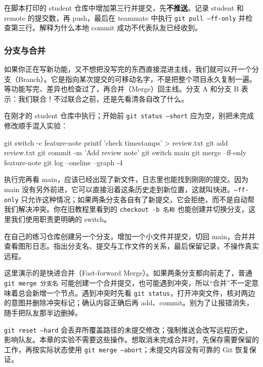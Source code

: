 \begin{exercise}\label{ex:v1-git-commits}
在脚本打印的 student 仓库中增加第三行并提交，先\textbf{不推送}。记录 student 和 remote 的提交数，再 push，最后在 teammate 中执行 \texttt{git pull --ff-only} 并检查第三行。解释为什么本地 commit 成功不代表队友已经收到。
\end{exercise}

\subsubsection{分支与合并}
如果你正在写新功能，又不想把没写完的东西直接混进主线，我们就可以开一个分支（Branch）。它是指向某次提交的可移动名字，不是把整个项目永久复制一遍。等功能写完、差异也检查过了，再合并（Merge）回主线。分支 A 和分支 B 表示：我们联合！不过联合之前，还是先看清各自改了什么。
\begin{example}[没有冲突的最小分支实验]
在刚才的 student 仓库中执行；开始前 \texttt{git status --short} 应为空，别把未完成修改顺手混入实验：

\begin{tbash}
git switch -c feature-note
printf 'check timestamps\n' > review.txt
git add review.txt
git commit -m 'Add review note'
git switch main
git merge --ff-only feature-note
git log --oneline --graph -4
\end{tbash}

执行完再看 main，应该已经出现了新文件，日志里也能找到刚刚的提交。因为 main 没有另外前进，它可以直接沿着这条历史走到新位置，这就叫快进。\texttt{--ff-only} 只允许这种情况；如果两条分支各自有了新提交，它会拒绝，而不是自动帮我们解决冲突。你在旧教程里看到的 \texttt{checkout -b 名称} 也能创建并切换分支，这里我们使用职责更明确的 switch。
\end{example}
\begin{exercise}\label{ex:v1-git-branch}
在自己的练习仓库创建另一个分支，增加一个小文件并提交，切回 main，合并并查看图形日志。指出分支名、提交与工作文件的关系，最后保留记录，不操作真实远程。
\end{exercise}
这里演示的是快进合并（Fast-forward Merge）。如果两条分支都向前走了，普通 \texttt{git merge 分支名} 可能创建一个合并提交，也可能遇到冲突，所以“合并”不一定意味着总会新增一个节点。遇到冲突时先看 \texttt{git status}，打开冲突文件，核对两边的意图并删除冲突标记；确认内容正确后再 add、commit。别为了让报错消失，随手把队友那半边删掉。
\begin{note}
\texttt{git reset --hard} 会丢弃所覆盖路径的未提交修改；强制推送会改写远程历史，影响队友。本章的实验不需要这些操作。想取消未完成合并时，先保存需要保留的工作，再按实际状态使用 \texttt{git merge --abort}；未提交内容没有可靠的 Git 恢复保证。
\end{note}

